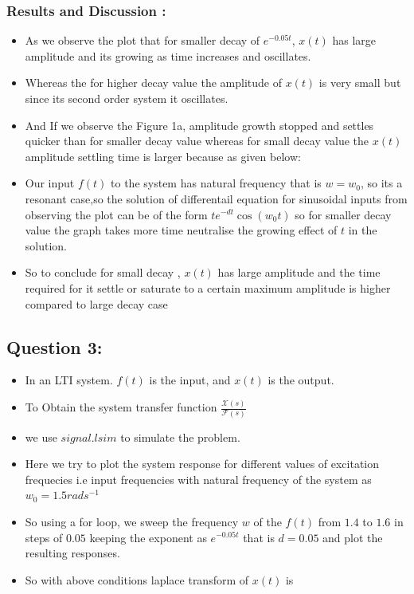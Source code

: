 \documentclass[11pt, a4paper]{article}
\begin{document}
\subsubsection{Results and Discussion :}\label{results-and-discussion}
\begin{itemize}
    \item
      As we observe the plot that for smaller decay of \(e^{-0.05t}\), \(x(t)\) has large amplitude and its growing as
      time increases and oscillates.
    \item
      Whereas the for higher decay value the amplitude of \(x(t)\) is very
      small but since its second order system it oscillates.
    \item
      And If we observe the Figure 1a, amplitude growth stopped and settles
      quicker than for smaller decay value whereas for small decay value
      the \(x(t)\) amplitude settling time is larger because as given below:
    \item
      Our input \(f(t)\) to the system has natural frequency that is
      \(w=w_0\), so its a resonant case,so the solution of differentail
      equation for sinusoidal inputs from observing the plot can be of the
      form \(te^{-dt}\cos (w_0 t)\) so for smaller decay value the graph
      takes more time neutralise the growing effect of \(t\) in the
      solution.
    \item
      So to conclude for small decay , \(x(t)\) has large amplitude and the
      time required for it settle or saturate to a certain maximum amplitude
      is higher compared to large decay case
    \end{itemize}
  \newpage
        \subsection{Question 3:}\label{question-3}
    
    \begin{itemize}
    \item
      In an LTI system. \(f(t)\) is the input, and \(x(t)\) is the output.
    \item
      To Obtain the system transfer function
      \(\frac{\mathcal {X}(s)}{ \mathcal {F}(s)}\)
    \item
      we use \(signal.lsim\) to simulate the problem.
    \item
      Here we try to plot the system response for different values of
      excitation frequecies i.e input frequencies with natural frequency of
      the system as \(w_0 = 1.5 rads^{-1}\)
    \item
      So using a for loop, we sweep the frequency \(w\) of the \(f(t)\) from
      \(1.4\) to \(1.6\) in steps of \(0.05\) keeping the exponent as
      \(e^{−0.05t}\) that is \(d=0.05\) and plot the resulting responses.
    \item
      So with above conditions laplace transform of \(x(t)\) is
    \end{itemize}
    
\end{document}
